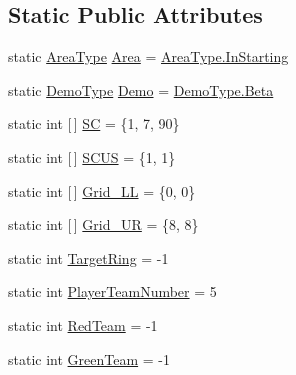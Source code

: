 \subsection*{Static Public Attributes}
\begin{DoxyCompactItemize}
\item 
static \hyperlink{enumca_1_1mcgill_1_1ecse211_1_1project_1_1_game_parameters_1_1_area_type}{Area\+Type} \hyperlink{enumca_1_1mcgill_1_1ecse211_1_1project_1_1_game_parameters_a32080f9c0e2e23c0feefc272620a07ad}{Area} = \hyperlink{enumca_1_1mcgill_1_1ecse211_1_1project_1_1_game_parameters_1_1_area_type_a90e9cb33114c7af62aa86684942265e5}{Area\+Type.\+In\+Starting}
\item 
static \hyperlink{enumca_1_1mcgill_1_1ecse211_1_1project_1_1_game_parameters_1_1_demo_type}{Demo\+Type} \hyperlink{enumca_1_1mcgill_1_1ecse211_1_1project_1_1_game_parameters_a36e932159f5f7e0f5e2e78f00d6f7e93}{Demo} = \hyperlink{enumca_1_1mcgill_1_1ecse211_1_1project_1_1_game_parameters_1_1_demo_type_a8d4e576df991cb52b50ae54b2812aa7f}{Demo\+Type.\+Beta}
\item 
static int \mbox{[}$\,$\mbox{]} \hyperlink{enumca_1_1mcgill_1_1ecse211_1_1project_1_1_game_parameters_af3944d1bc80c4c8a6cabce66e030f4b7}{SC} = \{1, 7, 90\}
\item 
static int \mbox{[}$\,$\mbox{]} \hyperlink{enumca_1_1mcgill_1_1ecse211_1_1project_1_1_game_parameters_a9c136a3a3faff96052381f791bf4c166}{S\+C\+US} = \{1, 1\}
\item 
static int \mbox{[}$\,$\mbox{]} \hyperlink{enumca_1_1mcgill_1_1ecse211_1_1project_1_1_game_parameters_ab190471dbd9bb10d8cef92c1b8bea826}{Grid\+\_\+\+LL} = \{0, 0\}
\item 
static int \mbox{[}$\,$\mbox{]} \hyperlink{enumca_1_1mcgill_1_1ecse211_1_1project_1_1_game_parameters_afbbca622863f674dfb00dcd93e1328cb}{Grid\+\_\+\+UR} = \{8, 8\}
\item 
static int \hyperlink{enumca_1_1mcgill_1_1ecse211_1_1project_1_1_game_parameters_a58f3515615bd8e55a036615a23b8ff80}{Target\+Ring} = -\/1
\item 
static int \hyperlink{enumca_1_1mcgill_1_1ecse211_1_1project_1_1_game_parameters_aa3fb61a4aa9d34ab4dd029eccb6e056c}{Player\+Team\+Number} = 5
\item 
static int \hyperlink{enumca_1_1mcgill_1_1ecse211_1_1project_1_1_game_parameters_ad36fe5629718c944df7317e53145850c}{Red\+Team} = -\/1
\item 
static int \hyperlink{enumca_1_1mcgill_1_1ecse211_1_1project_1_1_game_parameters_a1d6292807667d219edc172574c2aedbc}{Green\+Team} = -\/1

\end{DoxyCompactItemize}
